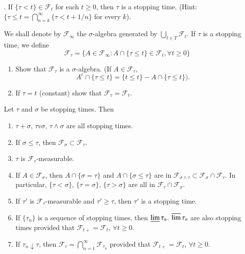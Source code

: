 . If $\{\tau<t\}\in \mathscr{F}_{t}$
for each $t\geq 0$, then $\tau$ is a stopping time. (Hint: $\{\tau\leq
t=\bigcap\limits^{\infty}_{n=k}\{\tau<t+1/n\}$ for every $k$).

We shall denote by $\mathscr{F}_{\infty}$ the $\sigma$-algebra
generated by $\bigcup\limits_{t\in T}\mathscr{F}_{t}$. If $\tau$ is a
stopping time, we define
$$
\mathscr{F}_{\tau}=\{A\in \mathscr{F}_{\infty}:A\cap \{\tau\leq t\}\in
\mathscr{F}_{t},\forall t\geq 0\}
$$

\begin{exercise}%
\begin{enumerate}
\renewcommand{\theenumi}{\alph{enumi}}
\renewcommand{\labelenumi}{(\theenumi)}
\item Show that $\mathscr{F}_{\tau}$ is a $\sigma$-algebra. (If $A\in
  \mathscr{F}_{\tau}$, 
$$
A^{c}\cap \{\tau\leq t\}=\{t\leq t\}-A\cap \{\tau \leq t\}).
$$

\item If $\tau=t$ (constant) show that
  $\mathscr{F}_{\tau}=\mathscr{F}_{t}$. 
\end{enumerate}
\end{exercise}

\begin{theorem*}
Let $\tau$ and $\sigma$ be stopping times. Then
\begin{enumerate}
\renewcommand{\theenumi}{\roman{enumi}}
\renewcommand{\labelenumi}{\rm(\theenumi)}
\item $\tau+\sigma$, $\tau v\sigma$, $\tau\wedge \sigma$ are all
  stopping times.

\item If $\sigma\leq\tau$, then $\mathscr{F}_{\sigma}\subset
  \mathscr{F}_{\tau}$. 

\item $\tau$ is $\mathscr{F}_{\tau}$-measurable.

\item If $A\in \mathscr{F}_{\sigma}$, then $A\cap \{\sigma=\tau\}$ and
  $A\cap \{\sigma\leq \tau\}$ are in $\mathscr{F}_{\sigma\wedge
  \tau}\subset \mathscr{F}_{\sigma}\cap \mathscr{F}_{\tau}$. In
  particular, $\{\tau<\sigma\}$,\pageoriginale 
  $\{\tau=\sigma\}$, $\{\tau>\sigma\}$
  are all in $\mathscr{F}_{\tau}\cap \mathscr{F}_{\sigma}$.

\item If $\tau'$ is $\mathscr{F}_{\tau}$-measurable and $\tau'\geq
  \tau$, then $\tau'$ is a stopping time.

\item If $\{\tau_{n}\}$ is a sequence of stopping times, then
  $\varliminf \tau_{n}$. $\varlimsup \tau_{n}$ are also stopping times
  provided that $\mathscr{F}_{t+}=\mathscr{F}_{t}$, $\forall t\geq 0$.

\item If $\tau_{n}\downarrow \tau$, then
  $\mathscr{F}_{\tau}=\bigcap\limits^{\infty}_{n=1}\mathscr{F}_{\tau_{n}}$
  provided that $\mathscr{F}_{t+}=\mathscr{F}_{t}$, $\forall t\geq 0$.
\end{enumerate}
\end{theorem*}

